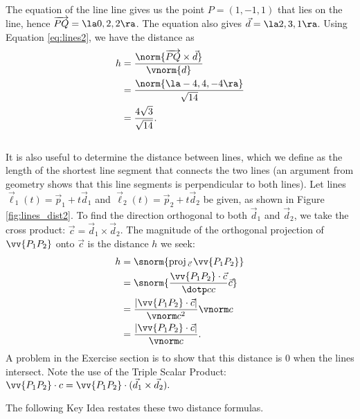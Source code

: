 {The equation of the line line gives us the point $P=(1,-1,1)$ that lies on the line, hence $\overrightarrow{PQ} = \la 0,2,2\ra$. The equation also gives $\vec d= \la 2,3,1\ra$. Using Equation \eqref{eq:lines2}, we have the distance as 
\begin{align*}
h &= \frac{\norm{\overrightarrow{PQ}\times \vec d}}{\vnorm{d}}\\
	&= \frac{\norm{\la -4,4,-4\ra}}{\sqrt{14}}\\
	&=\frac{4\sqrt{3}}{\sqrt{14}}.
\end{align*}
}\\

It is also useful to determine the distance between lines, which we define as the length of the shortest line segment that connects the two lines (an argument from geometry shows that this line segments is perpendicular to both lines). Let lines $\vec\ell_1(t) = \vec p_1 + t\vec d_1$ and $\vec\ell_2(t) = \vec p_2 + t\vec d_2$ be given, as shown in Figure \ref{fig:lines_dist2}. To find the direction orthogonal to both $\vec d_1$ and $\vec d_2$, we take the cross product: $\vec c = \vec d_1\times \vec d_2$. The magnitude of the orthogonal projection of $\vv{P_1P_2}$ onto $\vec c$ is the distance $h$ we seek:
\begin{align*}
h&=		\snorm{\text{proj}\,_{\vec c}\,\vv{P_1P_2}}\\
	&= \snorm{\frac{\vv{P_1P_2}\cdot\vec c}{\dotp cc}\vec c}\\
	&=\frac{\lvert\vv{P_1P_2}\cdot \vec c\rvert}{\vnorm c^2}\vnorm c\\
	&=\frac{\lvert\vv{P_1P_2}\cdot \vec c\rvert}{\vnorm c}.
\end{align*}
A problem in the Exercise section is to show that this distance is 0 when the lines intersect. Note the use of the Triple Scalar Product: $\vv{P_1P_2}\cdot c = \vv{P_1P_2}\cdot (\vec d_1\times \vec d_2).$


The following Key Idea restates these two distance formulas.

